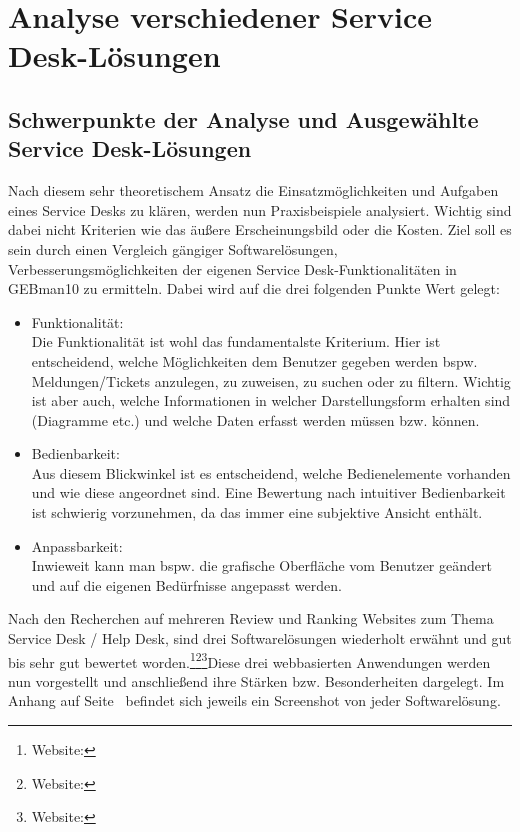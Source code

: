 \section{Analyse verschiedener Service Desk-Lösungen}

\subsection{Schwerpunkte der Analyse und Ausgewählte Service Desk-Lösungen}

\noindent
Nach diesem sehr theoretischem Ansatz die Einsatzmöglichkeiten und Aufgaben eines Service Desks zu klären, werden nun Praxisbeispiele analysiert. Wichtig sind dabei nicht Kriterien wie das äußere Erscheinungsbild oder die Kosten. Ziel soll es sein durch einen Vergleich gängiger Softwarelösungen, Verbesserungsmöglichkeiten der eigenen Service Desk-Funktionalitäten in GEBman10 zu ermitteln. Dabei wird auf die drei folgenden Punkte Wert gelegt:

\begin{itemize}
\item Funktionalität:\\
		Die Funktionalität ist wohl das fundamentalste Kriterium. Hier ist entscheidend, welche 			
		Möglichkeiten dem Benutzer gegeben werden bspw. Meldungen/Tickets anzulegen, zu 
		zuweisen, zu suchen oder zu filtern. Wichtig ist aber auch, welche Informationen in welcher 
		Darstellungsform erhalten sind (Diagramme etc.) und welche Daten erfasst werden müssen 
		bzw. können.\\
		 
\item Bedienbarkeit:\\
		Aus diesem Blickwinkel ist es entscheidend, welche Bedienelemente vorhanden und wie diese angeordnet sind. Eine	
		Bewertung nach intuitiver Bedienbarkeit ist schwierig vorzunehmen, da das immer eine
		subjektive Ansicht enthält.\\
		
\item Anpassbarkeit:\\
		Inwieweit kann man bspw. die grafische Oberfläche vom Benutzer geändert und auf die 
		eigenen Bedürfnisse angepasst werden.\\		
\end{itemize}


\noindent
Nach den Recherchen auf mehreren Review und Ranking Websites zum Thema Service Desk / Help Desk, sind drei Softwarelösungen wiederholt erwähnt und gut bis sehr gut bewertet worden.\footnote{Website:\cite{Ranking1}}\footnote{Website:\cite{Ranking2}}\footnote{Website:\cite{Ranking3}}Diese drei webbasierten Anwendungen werden nun vorgestellt und anschließend ihre Stärken bzw. Besonderheiten dargelegt. Im Anhang auf Seite~\pageref{Anhang3} befindet sich jeweils ein Screenshot von jeder Softwarelösung.

